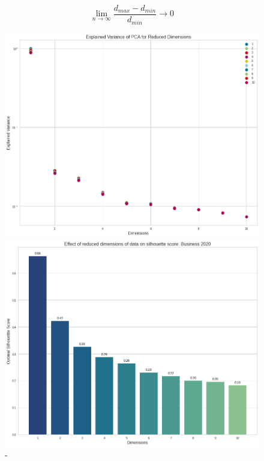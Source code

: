 \[ \lim_{n\to\infty} \frac{d_{max} - d_{min}}{d_{min}} \to0\]

\vspace{-2ex}
\begin{figure}[H]
  \centering
    \begin{minipage}[t]{.49\textwidth}
      \centering
      \includegraphics[width=\textwidth]{images/eval/explained_variances.png}
      \caption{-}
      \label{fig:explained_variance}
    \end{minipage}
    \begin{minipage}[t]{.49\textwidth}
      \centering
      \includegraphics[width=\textwidth]{images/eval/pca_silhouette.png}
      \caption{-}
      \label{fig:pca_sil}
    \end{minipage}
  \end{figure}

